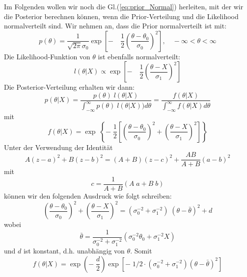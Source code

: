 Im Folgenden wollen wir noch die Gl.(\ref{eq:prior_Normal}) herleiten, mit der
wir die Posterior berechnen können, wenn die Prior-Verteilung und die Likelihood
normalverteilt sind.
Wir nehmen an, dass die Prior normalverteilt ist mit:
\begin{equation}
p(\theta) = \frac{1}{\sqrt{2\pi}\sigma_0}\exp\left[-\quad
\frac{1}{2}\left(\frac{\theta-\theta_0}{\sigma_0}\right)^2\right],
\quad -\infty < \theta < \infty
\end{equation}
Die Likelihood-Funktion von $\theta$ ist ebenfalls normalverteilt:
\begin{equation}
l(\theta|X) \propto \exp\left[-\quad
\frac{1}{2}\left(\frac{\theta-X}{\sigma_1}\right)^2\right]
\end{equation}
Die Posterior-Verteilung erhalten wir dann:
\begin{equation}
p(\theta|X) = \frac{p(\theta)\; l(\theta|X)}{\int_{-\infty}^{\infty}
p(\theta)\;l(\theta|X))d\theta} = \frac{f(\theta|X)}{\int_{-\infty}^{\infty}
f(\theta|X) d\theta}
\end{equation}
mit
\begin{equation}
f(\theta|X) = \exp \; \left\lbrace  -\; \frac{1}{2}
\left[\left(\frac{\theta - \theta_0}{\sigma_0}\right)^2 +
\left(\frac{\theta -X}{\sigma_1}\right)^2\right]  \right\rbrace
\end{equation}
Unter der Verwendung der Identität
\begin{equation}
A(z-a)^2+B(z-b)^2 = (A+B)(z-c)^2 + \frac{AB}{A+B}(a-b)^2
\end{equation}
mit
\begin{equation}
c = \frac{1}{A+B}(A\;a+B\;b)
\end{equation}
können wir den folgenden Ausdruck wie folgt schreiben:
\begin{equation}
\left( \frac{\theta-\theta_0}{\sigma_0}\right)^2 +
\left(\frac{\theta-X}{\sigma_1}\right)^2 =
(\sigma_0^{-2} + \sigma_1^{-2}) \; (\theta - \bar{\theta})^2 + d
\end{equation}
wobei
\[
\bar{\theta} = \frac{1}{\sigma_0^{-2}+\sigma_1^{-2}}
(\sigma_0^{-2}\theta_0 + \sigma_1^{-2} X)
\]
und $d$ ist konstant, d.h. unabhängig von $\theta$.
Somit
\begin{equation}
f(\theta |X) = \exp \left( -\; \frac{d}{2}\right) \exp [-\; 1/2 \cdot
(\sigma_0^{-2}+\sigma_1^{-2})(\theta - \bar{\theta})^2]
\end{equation}

